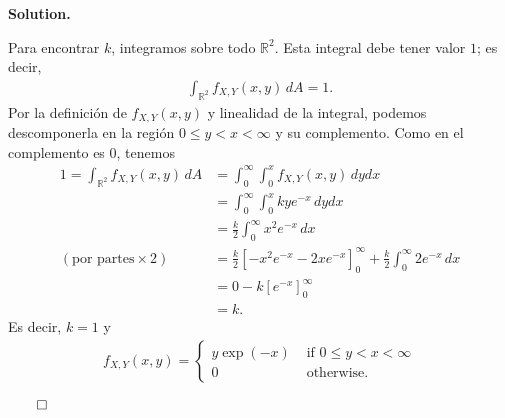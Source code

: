 \documentclass{article}
\theoremstyle{problemstyle}
\newenvironment{solution}{%
  \begin{mdframed}[linewidth=0.8pt,linecolor=Gray,backgroundcolor=Gray!5,roundcorner=5pt]%
  \noindent\textbf{Solution.}%
}{%
\hfill $ \qed $ 
  \end{mdframed}%
}
\newcommand{\R}{\mathbb R}
\begin{document}
\begin{solution}
	Para encontrar $ k $, integramos sobre todo $ \R^2 $. Esta integral debe tener valor $ 1 $; es decir,
	\begin{align*}
		\displaystyle\int_{\R^2} f_{X,Y}(x,y)\,dA = 1.
	\end{align*}
	Por la definici\'on de $ f_{X,Y}(x,y) $ y linealidad de la integral, podemos descomponerla en la regi\'on $ 0\leq y < x<\infty $ y su complemento. Como en el complemento es 0, tenemos
	\begin{align*}
		1=\displaystyle\int_{\R^2} f_{X,Y}(x,y)\,dA & = \int_{0}^{\infty}\int_{0}^{x} f_{X,Y}(x,y)\,dydx                                                     \\
		                                            & = \int_{0}^{\infty}\int_{0}^{x} kye^{-x}\,dydx                                                         \\
		                                            & = \frac{k}{2}\int_{0}^{\infty}x^2e^{-x}\,dx                                                            \\
		(\text{por partes}\times 2)                 & = \frac{k}{2}\left[-x^2e^{-x} - 2xe^{-x}\right]_{0}^{\infty} + \frac{k}{2}\int_{0}^{\infty}2e^{-x}\,dx \\
		                                            & = 0 - k [e^{-x}]_{0}^{\infty}                                                                          \\
		                                            & = k.
	\end{align*}
	Es decir, $ k=1 $ y
	\begin{align*}
		f_{X,Y}(x,y) =
		\begin{cases}
			y\exp(-x) & \text{ if } 0\leq y<x<\infty \\
			0         & \text{ otherwise}.
		\end{cases}
	\end{align*}


\end{solution}
\end{document}
